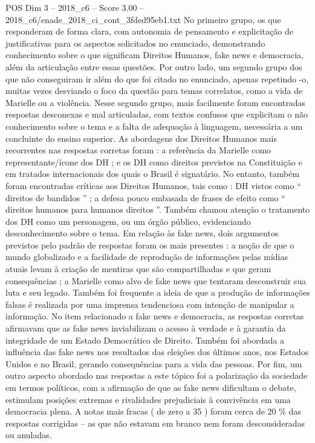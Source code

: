 \begin{textsample}{POS Dim 3 – 2018\_c6 – Score 3.00 – 2018\_c6/enade\_2018\_ci\_cont\_3fded95eb1.txt}
No primeiro grupo, os que responderam de forma clara, com autonomia de pensamento e explicitação de justificativas para os aspectos solicitados no enunciado, demonstrando conhecimento sobre o que significam Direitos Humanos, fake news e democracia, além da articulação entre essas questões.
Por outro lado, um segundo grupo dos que não conseguiram ir além do que foi citado no enunciado, apenas repetindo -o, muitas vezes desviando o foco da questão para temas correlatos, como a vida de Marielle ou a violência.
Nesse segundo grupo, mais facilmente foram encontradas respostas desconexas e mal articuladas, com textos confusos que explicitam o não conhecimento sobre o tema e a falta de adequação à linguagem, necessária a um concluinte do ensino superior.
As abordagens dos Direitos Humanos mais recorrentes nas respostas corretas foram : a referência da Marielle como representante/ícone dos DH ; e os DH como direitos previstos na Constituição e em tratados internacionais dos quais o Brasil é signatário.
No entanto, também foram encontradas críticas aos Direitos Humanos, tais como : DH vistos como “ direitos de bandidos ” ; a defesa pouco embasada de frases de efeito como “ direitos humanos para humanos direitos ”.
Também chamou atenção o tratamento dos DH como um personagem, ou um órgão público, evidenciando desconhecimento sobre o tema.
Em relação às fake news, dois argumentos previstos pelo padrão de respostas foram os mais presentes : a noção de que o mundo globalizado e a facilidade de reprodução de informações pelas mídias atuais levam à criação de mentiras que são compartilhadas e que geram consequências ; a Marielle como alvo de fake news que tentaram desconstruir sua luta e seu legado.
Também foi frequente a ideia de que a produção de informações falsas é realizada por uma imprensa tendenciosa com intenção de manipular a informação.
No item relacionado a fake news e democracia, as respostas corretas afirmavam que as fake news inviabilizam o acesso à verdade e à garantia da integridade de um Estado Democrático de Direito.
Também foi abordada a influência das fake news nos resultados das eleições dos últimos anos, nos Estados Unidos e no Brasil, gerando consequências para a vida das pessoas.
Por fim, um outro aspecto abordado nas respostas a este tópico foi a polarização da sociedade em termos políticos, com a afirmação de que as fake news dificultam o debate, estimulam posições extremas e rivalidades prejudiciais à convivência em uma democracia plena.
A notas mais fracas ( de zero a 35 ) foram cerca de 20 \% das respostas corrigidas – as que não estavam em branco nem foram desconsideradas ou anuladas.

\end{textsample}

